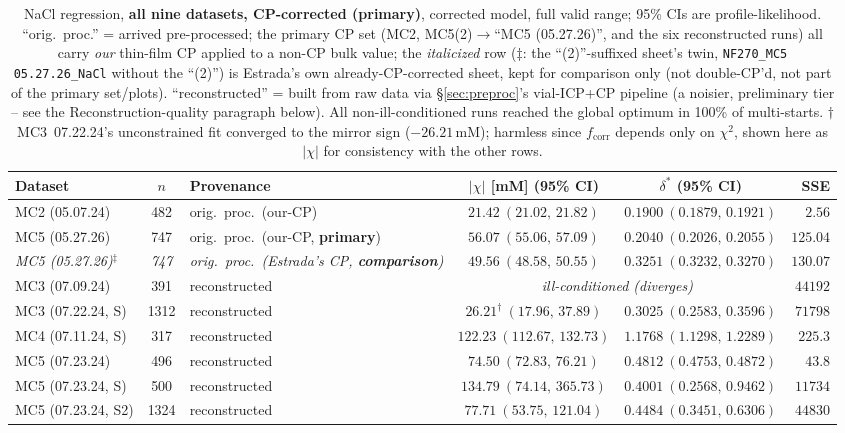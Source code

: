 \documentclass[11pt]{article}
\newcommand{\dstar}{\delta^{*}}
\begin{document}
\begin{table}[H]
\centering\footnotesize\setlength{\tabcolsep}{4pt}
\begin{tabular}{lclccr}
\toprule
Dataset & $n$ & Provenance & $|\chi|$ [\si{mM}] (95\% CI) & $\dstar$ (95\% CI) & SSE \\
\midrule
MC2 (05.07.24)      & 482  & orig.\ proc.\ (our-CP) & $21.42\ (21.02,\,21.82)$   & $0.1900\ (0.1879,\,0.1921)$ & $2.56$\\
MC5 (05.27.26)      & 747  & orig.\ proc.\ (our-CP, \textbf{primary}) & $56.07\ (55.06,\,57.09)$   & $0.2040\ (0.2026,\,0.2055)$ & $125.04$\\
\emph{MC5 (05.27.26)$^\ddagger$} & \emph{747} & \emph{orig.\ proc.\ (Estrada's CP, \textbf{comparison})} & \emph{$49.56\ (48.58,\,50.55)$} & \emph{$0.3251\ (0.3232,\,0.3270)$} & \emph{$130.07$}\\
MC3 (07.09.24)      & 391  & reconstructed & \multicolumn{2}{c}{\emph{ill-conditioned (diverges)}} & $44192$\\
MC3 (07.22.24, S)   & 1312 & reconstructed & $26.21^\dagger\ (17.96,\,37.89)$   & $0.3025\ (0.2583,\,0.3596)$ & $71798$\\
MC4 (07.11.24, S)   & 317  & reconstructed & $122.23\ (112.67,\,132.73)$ & $1.1768\ (1.1298,\,1.2289)$ & $225.3$\\
MC5 (07.23.24)      & 496  & reconstructed & $74.50\ (72.83,\,76.21)$   & $0.4812\ (0.4753,\,0.4872)$ & $43.8$\\
MC5 (07.23.24, S)   & 500  & reconstructed & $134.79\ (74.14,\,365.73)$ & $0.4001\ (0.2568,\,0.9462)$ & $11734$\\
MC5 (07.23.24, S2)  & 1324 & reconstructed & $77.71\ (53.75,\,121.04)$   & $0.4484\ (0.3451,\,0.6306)$ & $44830$\\
\bottomrule
\end{tabular}
\caption{NaCl regression, \textbf{all nine datasets, CP-corrected (primary)},
corrected model, full valid range; 95\% CIs are profile-likelihood. ``orig.\
proc.'' = arrived pre-processed; the primary CP set (MC2, MC5(2)$\to$``MC5
(05.27.26)'', and the six reconstructed runs) all carry \emph{our} thin-film CP
applied to a non-CP bulk value; the \emph{italicized} row ($\ddagger$: the
``(2)''-suffixed sheet's twin, \texttt{NF270\_MC5 05.27.26\_NaCl} without the
``(2)'') is
Estrada's own already-CP-corrected sheet, kept for comparison only (not
double-CP'd, not part of the primary set/plots). ``reconstructed'' = built from
raw data via \S\ref{sec:preproc}'s
vial-ICP+CP pipeline (a noisier, preliminary tier -- see the
Reconstruction-quality paragraph below). All non-ill-conditioned runs reached the
global optimum in 100\% of multi-starts. $\dagger$MC3~07.22.24's unconstrained fit
converged to the mirror sign ($-26.21$\,mM); harmless since $f_{\text{corr}}$
depends only on $\chi^2$, shown here as $|\chi|$ for consistency with the other
rows.}
\label{tab:naclall}
\end{table}
\end{document}
